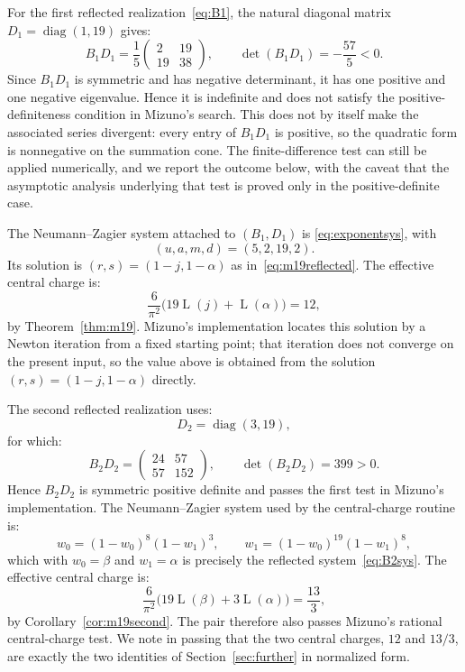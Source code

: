 \documentclass[preprint,12pt,number]{elsarticle}
\theoremstyle{remark}
\newcommand{\Lr}{\operatorname{L}}
\begin{document}
For the first reflected realization~\eqref{eq:B1}, the natural diagonal
matrix $D_1=\operatorname{diag}(1,19)$ gives:
\[
B_1D_1=\frac15\begin{pmatrix}2&19\\19&38\end{pmatrix},
\qquad
\det(B_1D_1)=-\frac{57}{5}<0 .
\]
Since $B_1D_1$ is symmetric and has negative determinant, it has one positive
and one negative eigenvalue.  Hence it is indefinite and does not satisfy
the positive-definiteness condition in Mizuno's search.  This does not by
itself make the associated series divergent: every entry of $B_1D_1$ is
positive, so the quadratic form is nonnegative on the summation cone.  The
finite-difference test can still be applied numerically, and we report the
outcome below, with the caveat that the asymptotic analysis underlying that
test is proved only in the positive-definite case.

The Neumann--Zagier system attached to $(B_1,D_1)$ is
\eqref{eq:exponentsys}, with
\[
(u,a,m,d)=(5,2,19,2).
\]
Its solution is $(r,s)=(1-j,1-\alpha)$ as in~\eqref{eq:m19reflected}.
The effective central charge is:
\[
\frac{6}{\pi^2}\bigl(19\Lr(j)+\Lr(\alpha)\bigr)=12 ,
\]
by Theorem~\ref{thm:m19}.  Mizuno's implementation locates this solution by a
Newton iteration from a fixed starting point; that iteration does not converge
on the present input, so the value above is obtained from the solution
$(r,s)=(1-j,1-\alpha)$ directly.

The second reflected realization uses:
\begin{equation}\label{eq:D2}
D_2=\operatorname{diag}(3,19),
\end{equation}
for which:
\begin{equation}\label{eq:B2sym}
B_2D_2=\begin{pmatrix}24&57\\57&152\end{pmatrix},
\qquad
\det(B_2D_2)=399>0 .
\end{equation}
Hence $B_2D_2$ is symmetric positive definite and passes the first test in
Mizuno's implementation.  The Neumann--Zagier system used by the
central-charge routine is:
\[
w_0=(1-w_0)^8(1-w_1)^3,
\qquad
w_1=(1-w_0)^{19}(1-w_1)^8 ,
\]
which with $w_0=\beta$ and $w_1=\alpha$ is precisely the reflected
system~\eqref{eq:B2sys}.  The effective central charge is:
\[
\frac{6}{\pi^2}\bigl(19\Lr(\beta)+3\Lr(\alpha)\bigr)=\frac{13}{3},
\]
by Corollary~\ref{cor:m19second}.  The pair therefore also passes
Mizuno's rational central-charge test.  We note in passing that the two
central charges, $12$ and $13/3$, are exactly the two identities of
Section~\ref{sec:further} in normalized form.
\end{document}
